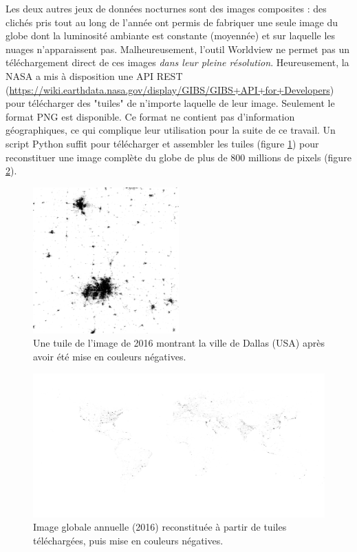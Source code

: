 \documentclass[a4paper, 11pt]{report}
\begin{document}
Les deux autres jeux de données nocturnes sont des images composites : des clichés pris tout au long de l'année ont permis de fabriquer une seule image du globe dont la luminosité ambiante est constante (moyennée) et sur laquelle les nuages n'apparaissent pas. Malheureusement, l'outil Worldview ne permet pas un téléchargement direct de ces images \textit{dans leur pleine résolution}. Heureusement, la NASA a mis à disposition une API REST (\url{https://wiki.earthdata.nasa.gov/display/GIBS/GIBS+API+for+Developers}) pour télécharger des "tuiles" de n'importe laquelle de leur image. Seulement le format PNG est disponible. Ce format ne contient pas d'information géographiques, ce qui complique leur utilisation pour la suite de ce travail. Un script Python suffit pour télécharger et assembler les tuiles (figure \ref{nasa-worldview-tile}) pour reconstituer une image complète du globe de plus de 800 millions de pixels (figure \ref{nasa-worldview-tiles}).

\begin{figure}[h]
	\centering
	\includegraphics[width=0.5\textwidth]{img/018-012.png}
	\caption{Une tuile de l'image de 2016 montrant la ville de Dallas (USA) après avoir été mise en couleurs négatives.}
	\label{nasa-worldview-tile}
\end{figure}

\begin{figure}
	\centering
	\includegraphics[width=0.8\paperheight, angle=-90, origin=c]{img/tiles_2016_zoom6.png}
	\caption{Image globale annuelle (2016) reconstituée à partir de tuiles téléchargées, puis mise en couleurs négatives.}
	\label{nasa-worldview-tiles}
\end{figure}
\end{document}
